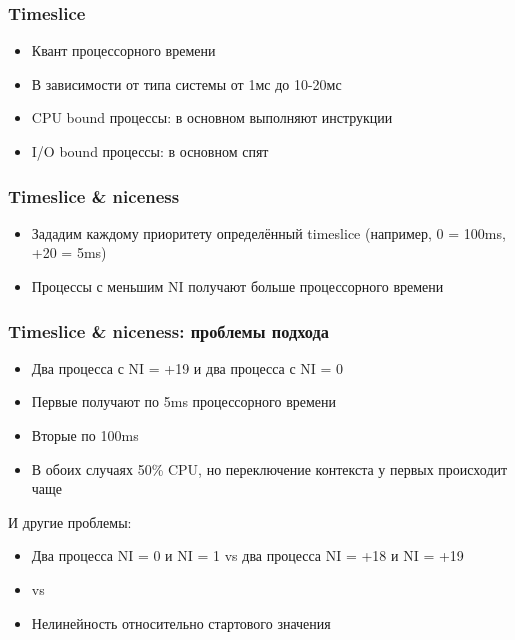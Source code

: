   \subsubsection{Timeslice}
    \begin{itemize}
      \item Квант процессорного времени
      \item В зависимости от типа системы от 1мс до 10-20мс
      \item CPU bound процессы: в основном выполняют инструкции
      \item I/O bound процессы: в основном спят
    \end{itemize}
  
  \subsubsection{Timeslice \& niceness}
    \begin{itemize}
      \item Зададим каждому приоритету определённый timeslice (например, 0 = 100ms, +20 = 5ms)
      \item Процессы с меньшим NI получают больше процессорного времени
    \end{itemize}
  
  \subsubsection{Timeslice \& niceness: проблемы подхода}
    \begin{itemize}
      \item Два процесса с NI = +19 и два процесса с NI = 0
      \item Первые получают по 5ms процессорного времени
      \item Вторые по 100ms
      \item В обоих случаях 50\% CPU, но переключение контекста у первых происходит чаще
    \end{itemize}
  
    И другие проблемы:
    \begin{itemize}
      \item Два процесса NI = 0 и NI = 1 vs два процесса NI = +18 и NI = +19
      \item {} vs 
      \item Нелинейность относительно стартового значения
    \end{itemize}
  
